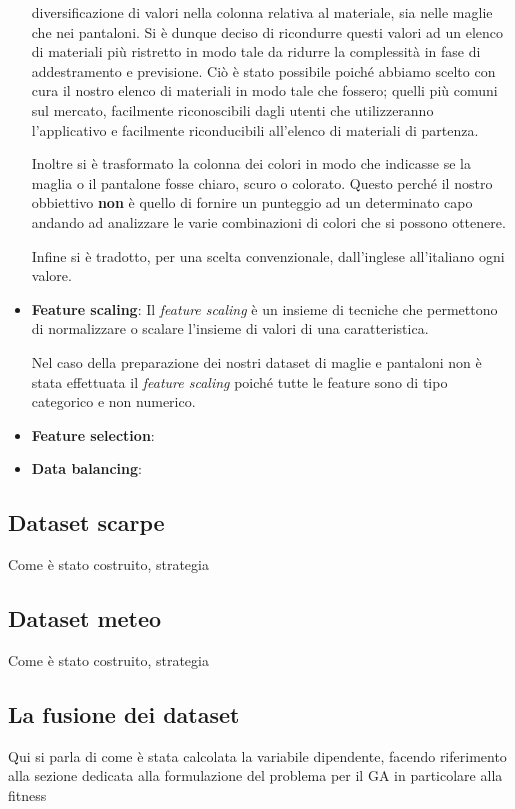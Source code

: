 \documentclass[a4paper, 11pt, oneside]{report}
\begin{document}
\begin{itemize}
                    diversificazione di valori nella colonna relativa al materiale, sia nelle maglie che nei pantaloni.
                    Si è dunque deciso di ricondurre questi valori ad un elenco di materiali più ristretto in modo tale da ridurre
                    la complessità in fase di addestramento e previsione.
                    Ciò è stato possibile poiché abbiamo scelto con cura il nostro elenco di materiali in modo tale che fossero;
                    quelli più comuni sul mercato, facilmente riconoscibili dagli utenti che utilizzeranno l'applicativo e
                    facilmente riconducibili all'elenco di materiali di partenza.
                    \par \noindent Inoltre si è trasformato la colonna dei colori in modo che indicasse se la maglia o il pantalone
                    fosse chiaro, scuro o colorato.
                    Questo perché il nostro obbiettivo \textbf{non} è quello di fornire un punteggio ad un determinato capo andando ad
                    analizzare le varie combinazioni di colori che si possono ottenere.
                    \par \noindent Infine si è tradotto, per una scelta convenzionale, dall'inglese all'italiano ogni valore.
                    \item \textbf{Feature scaling}: Il \textit{feature scaling} è un insieme di tecniche che permettono di
                    normalizzare o scalare l'insieme di valori di una caratteristica.
                    \par \noindent Nel caso della preparazione dei nostri dataset di maglie e pantaloni non è stata effettuata
                    il  \textit{feature scaling} poiché tutte le feature sono di tipo categorico e non numerico.
                    \item \textbf{Feature selection}:
                    \item \textbf{Data balancing}:
                \end{itemize}
                \subsection{Dataset scarpe}
                Come è stato costruito, strategia
                \subsection{Dataset meteo}
                Come è stato costruito, strategia
                \subsection{La fusione dei dataset}
                Qui si parla di come è stata calcolata la variabile dipendente, facendo riferimento alla sezione dedicata
                alla formulazione del problema per il GA in particolare alla fitness
\end{document}
